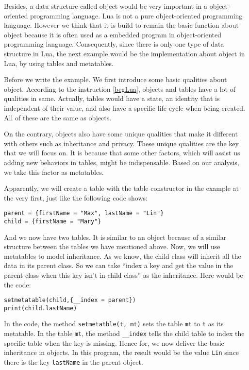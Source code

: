 Besides, a data structure called object would be very important in a object-oriented programming language. Lua is not a pure object-oriented programming language. However we think that it is build to remain the basic function about object because it is often used as a embedded program in object-oriented programming language. Consequently, since there is only one type of data structure in Lua, the next example would be the implementation about object in Lua, by using tables and metatables.

Before we write the example. We first introduce some basic qualities about object. According to the instruction \ref{begLua}, objects and tables have a lot of qualities in same. Actually, tables would have a state, an identity that is independent of their value, and also have a specific life cycle when being created. All of these are the same as objects.

On the contrary, objects also have some unique qualities that make it different with others such as inheritance and privacy. These unique qualities are the key that we will focus on. It is because that some other factors, which will assist us adding new behaviors in tables, might be indispensable. Based on our analysis, we take this factor as metatables.

Apparently, we will create a table with the table constructor in the example at the very first, just like the following code shows:
\begin{flushleft}
\tt parent = \{firstName = "Max", lastName = "Lin"\} \\
\tt child = \{firstName = "Mary"\} \\
\end{flushleft}
And we now have two tables. It is similar to an object because of a similar structure between the tables we have mentioned above. Now, we will use metatables to model inheritance. As we know, the child class will inherit all the data in its parent class. So we can take ``index a key and get the value in the parent class when this key isn't in child class'' as the inheritance. Here would be the code:
\begin{flushleft}
\tt setmetatable(child,\{\_\_index = parent\}) \\
\tt print(child.lastName)\\
\end{flushleft}

In the code, the method {\tt setmetatble(t, mt)} sets the table {\tt mt} to {\tt t} as its metatable. In the table {\tt mt}, the method {\tt \_\_index} tells the child table to index the specific table when the key is missing. Hence for, we now deliver the basic inheritance in objects. In this program, the result would be the value {\tt Lin} since there is the key {\tt lastName} in the parent object.
